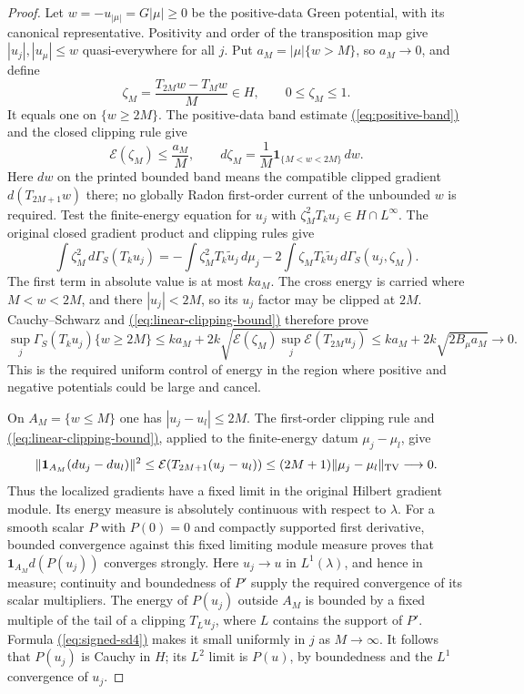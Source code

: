 \documentclass[11pt,reqno]{amsart}
\theoremstyle{definition}
\theoremstyle{remark}
\numberwithin{equation}{section}
\newcommand{\MathEqref}[1]{\begingroup\hypersetup{linkcolor=EquationLink}\hyperref[#1]{(\ref*{#1})}\endgroup}
\begin{document}
\begin{proof}
Let $w=-u_{|\mu|}=G|\mu|\ge0$ be the positive-data Green
potential, with its canonical representative.  Positivity and
order of the transposition map give
$|u_j|,|u_\mu|\le w$ quasi-everywhere for all $j$.
Put $a_M=|\mu|\{w>M\}$, so $a_M\to0$, and define
\[
          \zeta_M=\frac{T_{2M}w-T_Mw}{M}\in H,\qquad
          0\le\zeta_M\le1.
\]
It equals one on $\{w\ge2M\}$.  The positive-data band estimate \MathEqref{eq:positive-band} and the closed clipping rule give
\begin{equation}\label{eq:signed-sd3}
 \mathcal E(\zeta_M)\le\frac{a_M}{M},\qquad
 d\zeta_M=\frac1M\mathbf1_{\{M<w<2M\}}\,dw.
\end{equation}
Here $dw$ on the printed bounded band means the compatible
clipped gradient $d(T_{2M+1}w)$ there; no globally Radon
first-order current of the unbounded $w$ is required.
Test the finite-energy equation for $u_j$ with
$\zeta_M^2T_ku_j\in H\cap L^\infty$.
The original closed gradient product and clipping rules give
\[
 \int\zeta_M^2\,d\Gamma_S(T_ku_j)
  =-\int\zeta_M^2 T_k\widetilde u_j\,d\mu_j
                  -2\int\zeta_M T_k\widetilde u_j\,
                                      d\Gamma_S(u_j,\zeta_M).
\]
The first term in absolute value is at most $k a_M$.
The cross energy is carried where $M<w<2M$, and there
$|u_j|<2M$, so its $u_j$ factor may be clipped at $2M$.
Cauchy--Schwarz and \MathEqref{eq:linear-clipping-bound} therefore prove
\begin{equation}\label{eq:signed-sd4}
 \sup_j\Gamma_S(T_ku_j)\{w\ge2M\}
   \le k a_M+2k\sqrt{\mathcal E(\zeta_M)
                                 \sup_j\mathcal E(T_{2M}u_j)}
   \le k a_M+2k\sqrt{2B_\mu a_M}\longrightarrow0.
\end{equation}
This is the required uniform control of energy in the region
where positive and negative potentials could be large and cancel.

On $A_M=\{w\le M\}$ one has $|u_j-u_l|\le2M$.
The first-order clipping rule and \MathEqref{eq:linear-clipping-bound}, applied to the
finite-energy datum $\mu_j-\mu_l$, give
\begin{equation}\label{eq:signed-sd5}
 \|\mathbf1_{A_M}(du_j-du_l)\|^2
      \le\mathcal E(T_{2M+1}(u_j-u_l))
      \le(2M+1)\|\mu_j-\mu_l\|_{\rm TV}\longrightarrow0.
\end{equation}
Thus the localized gradients have a fixed limit in the
original Hilbert gradient module.  Its energy measure is
absolutely continuous with respect to $\lambda$.
For a smooth scalar $P$ with $P(0)=0$ and compactly supported
first derivative, bounded convergence against this fixed
limiting module measure proves that
$\mathbf1_{A_M}d(P(u_j))$ converges strongly.
Here $u_j\to u$ in $L^1(\lambda)$, and hence in measure;
continuity and boundedness of $P'$ supply the required
convergence of its scalar multipliers.
The energy of $P(u_j)$ outside $A_M$ is bounded by a fixed
multiple of the tail of a clipping $T_Lu_j$, where $L$
contains the support of $P'$.  Formula \MathEqref{eq:signed-sd4} makes it small
uniformly in $j$ as $M\to\infty$.
It follows that $P(u_j)$ is Cauchy in $H$; its $L^2$ limit
is $P(u)$, by boundedness and the $L^1$ convergence of $u_j$.


\end{proof}
\end{document}
